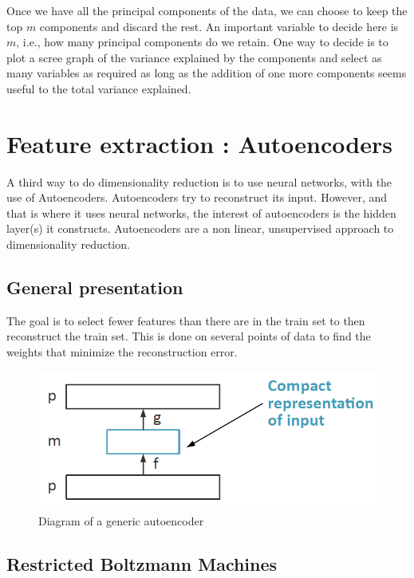 \documentclass{article}
\begin{document}
\bigskip

Once we have all the principal components of the data, we can choose to keep the top $m$ components and discard the rest. An important variable to decide here is $m$, i.e., how many principal components do we retain. One way to decide is to plot a scree graph of the variance explained by the components and select as many variables as required as long as the addition of one more components seems useful to the total variance explained.

\section{Feature extraction : Autoencoders}

A third way to do dimensionality reduction is to use neural networks, with the use of Autoencoders. Autoencoders try to reconstruct its input. However, and that is where it uses neural networks, the interest of autoencoders is the hidden layer(s) it constructs. Autoencoders are a non linear, unsupervised approach to dimensionality reduction.

\subsection{General presentation}

The goal is to select fewer features than there are in the train set to then reconstruct the train set. This is done on several points of data to find the weights that minimize the reconstruction error.

\begin{figure}[!h]
    \center
    \includegraphics[scale=0.5]{./figures/autoencoder_general.png}
    \caption{Diagram of a generic autoencoder}
\end{figure}

\subsection{Restricted Boltzmann Machines}
\end{document}
